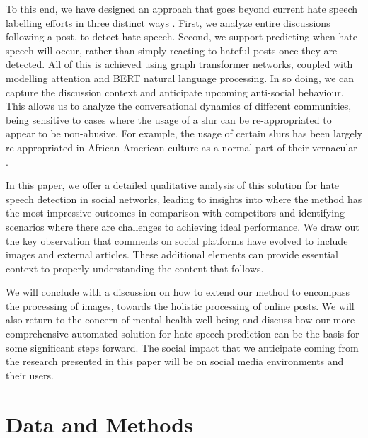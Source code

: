 \documentclass[letterpaper]{article} %
\newcommand{\edit}[1]{{#1}}
\begin{document}
To this end, we have designed an approach that goes beyond current hate speech labelling efforts in three distinct ways \cite{hebert2022predicting}. First, we analyze entire discussions following a post, to detect hate speech. Second, we support predicting when hate speech will occur, rather than simply reacting to hateful posts once they are detected.
All of this is achieved using graph transformer networks, coupled with modelling attention and BERT natural language processing. In so doing, we can capture the discussion context and anticipate upcoming anti-social behaviour.
This allows us to analyze the conversational dynamics of different communities, being sensitive to cases where the usage of a slur can be re-appropriated to appear to be non-abusive. For example, the usage of certain slurs has been largely re-appropriated in African American culture as a normal part of their vernacular \cite{thomas2007phonological}.

In this paper, we offer a detailed qualitative analysis of this solution for hate speech detection in social networks, leading to insights into where the method has the most impressive outcomes in comparison with competitors and identifying scenarios where there are challenges to achieving ideal performance. We draw out the key observation that comments on social platforms have evolved to include images and external articles. These additional elements can provide essential context to properly understanding the content that follows.

We will conclude with a discussion on how to extend \edit{our method} to encompass the processing of images, towards the holistic processing of online posts. We will also return to the concern of mental health well-being and discuss how our more comprehensive automated solution for hate speech prediction can be the basis for some significant steps forward. The social impact that we anticipate coming from the research presented in this paper will be on social media environments and their users.

\section{Data and Methods}
\end{document}
